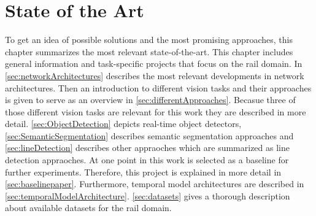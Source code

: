 \chapter{State of the Art}
\label{sec:stateOfTheArt}

To get an idea of possible solutions and the most promising approaches, this chapter summarizes the most relevant state-of-the-art.
This chapter includes general information and task-specific projects that focus on the rail domain.
In \autoref{sec:networkArchitectures} describes the most relevant developments in network architectures.
Then an introduction to different vision tasks and their approaches is given to serve as an overview in \autoref{sec:differentApproaches}.
Becasue three of those different vision tasks are relevant for this work they are described in more detail.
\autoref{sec:ObjectDetection} depicts real-time object detectors, \autoref{sec:SemanticSegmentation} describes semantic segmentation approaches and \autoref{sec:lineDetection} describes other appraoches which are summarized as line detection appraoches.
At one point in this work \cite{tepNet2024} is selected as a baseline for further experiments.
Therefore, this project is explained in more detail in \autoref{sec:baselinepaper}.
Furthermore, temporal model architectures are described in \autoref{sec:temporalModelArchitecture}.
\autoref{sec:datasets} gives a thorough description about available datasets for the rail domain.





\clearpage








\clearpage 



